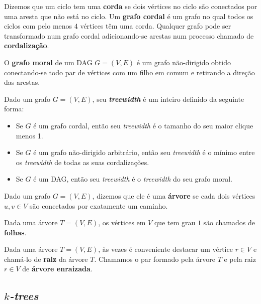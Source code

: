 Dizemos que um ciclo tem uma \textbf{corda} se dois vértices no ciclo são conectados por uma aresta que não está no ciclo. Um \textbf{grafo cordal} é um grafo no qual todos os ciclos com pelo menos $4$ vértices têm uma corda. Qualquer grafo pode ser transformado num grafo cordal adicionando-se arestas num processo chamado de \textbf{cordalização}.

O \textbf{grafo moral} de um DAG $G = (V, E)$ é um grafo não-dirigido obtido conectando-se todo par de vértices com um filho em comum e retirando a direção das arestas.

\begin{definition}
  \cite{maua} Dado um grafo $G = (V, E)$, seu \textbf{\emph{treewidth}} é um inteiro definido da seguinte forma:

  \begin{itemize}
    \item Se $G$ é um grafo cordal, então seu \emph{treewidth} é o tamanho do seu maior clique menos 1.
    \item Se $G$ é um grafo não-dirigido arbitrário, então seu \emph{treewidth} é o mínimo entre os \emph{treewidth} de todas as suas cordalizações.
    \item Se $G$ é um DAG, então seu \emph{treewidth} é o \emph{treewidth} do seu grafo moral.
  \end{itemize}
\end{definition}

\begin{definition}[árvore]
  Dado um grafo $G = (V, E)$, dizemos que ele é uma \textbf{árvore} se cada dois vértices $u, v \in V$ são conectados por exatamente um caminho.
\end{definition}

Dada uma árvore $T = (V, E)$, os vértices em $V$ que tem grau $1$ são chamados de \textbf{folhas}.

Dada uma árvore $T = (V, E)$, às vezes é conveniente destacar um vértice $r \in V$ e chamá-lo de \textbf{raiz} da árvore $T$. Chamamos o par formado pela árvore $T$ e pela raiz $r \in V$ de \textbf{árvore enraizada}.

\subsection{\emph{$k$-trees}}

